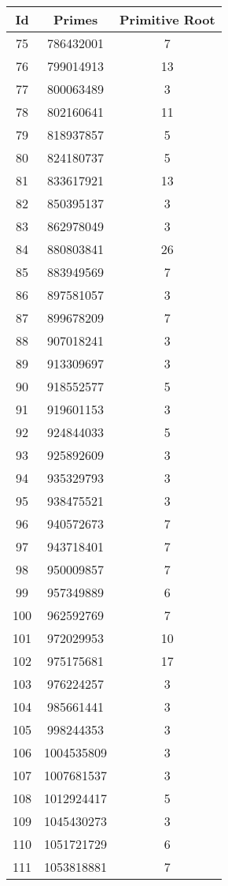 \begin{spacing}{0.97}
\begin{tabular}{ccc}
\toprule
	   Id & Primes & Primitive Root\\
 \midrule
 75 & 786432001 & 7\\
 76 & 799014913 & 13\\
 77 & 800063489 & 3\\
 78 & 802160641 & 11\\
 79 & 818937857 & 5\\
 80 & 824180737 & 5\\
 81 & 833617921 & 13\\
 82 & 850395137 & 3\\
 83 & 862978049 & 3\\
 84 & 880803841 & 26\\
 85 & 883949569 & 7\\
 86 & 897581057 & 3\\
 87 & 899678209 & 7\\
 88 & 907018241 & 3\\
 89 & 913309697 & 3\\
 90 & 918552577 & 5\\
 91 & 919601153 & 3\\
 92 & 924844033 & 5\\
 93 & 925892609 & 3\\
 94 & 935329793 & 3\\
 95 & 938475521 & 3\\
 96 & 940572673 & 7\\
 97 & 943718401 & 7\\
 98 & 950009857 & 7\\
 99 & 957349889 & 6\\
 100 & 962592769 & 7\\
 101 & 972029953 & 10\\
 102 & 975175681 & 17\\
 103 & 976224257 & 3\\
 104 & 985661441 & 3\\
 105 & 998244353 & 3\\
 106 & 1004535809 & 3\\
 107 & 1007681537 & 3\\
 108 & 1012924417 & 5\\
 109 & 1045430273 & 3\\
 110 & 1051721729 & 6\\
 111 & 1053818881 & 7\\
\bottomrule
\end{tabular}
\end{spacing}

